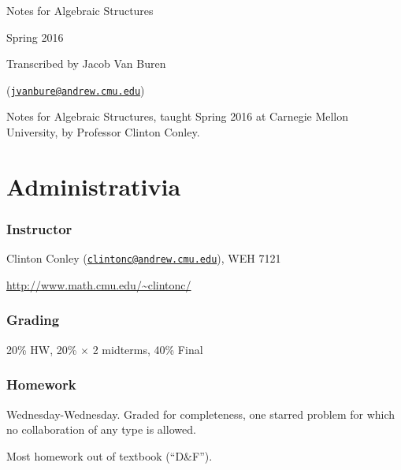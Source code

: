 \documentclass[notes.tex]{subfiles}
\begin{document}
\begin{titlepage}
\begin{minipage}{\textwidth}
	\begin{center}
		{\LARGE\selectfont Notes for Algebraic Structures\vspace{1em}

		\large Spring 2016}\vspace{2em}

		Transcribed by Jacob Van Buren 

		(\href{mailto:jvanbure@andrew.cmu.edu}{\nolinkurl{jvanbure@andrew.cmu.edu}})

		\vspace{0.5in}
		{\fontsize{11pt}{0pt}\selectfont
		Notes for Algebraic Structures, taught Spring 2016 at Carnegie Mellon University, by Professor Clinton Conley.
		}
	\end{center}
\end{minipage}
\vfill
\begin{minipage}{\textwidth}
	\chapter*{Administrativia}
	\subsection*{Instructor}
	Clinton Conley (\href{mailto:clintonc@andrew.cmu.edu}{\nolinkurl{clintonc@andrew.cmu.edu}}), WEH 7121

	\url{http://www.math.cmu.edu/~clintonc/}

	\subsection*{Grading}
	20\% HW, 
	20\% $\times$ 2 midterms,
	40\% Final

	\subsection*{Homework} Wednesday-Wednesday.
	Graded for completeness, one starred problem for which no collaboration of any type is allowed.

	Most homework out of textbook (``D\&F'').
\end{minipage}
\vspace{1in}
\end{titlepage}
\end{document}
